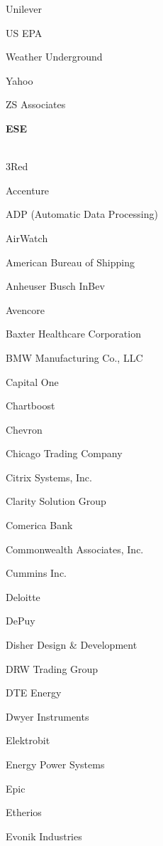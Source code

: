 \documentclass[twoside]{article}
\begin{document}
\begin{center}
\begin{multicols}{5}
\begin{FlushLeft}
\begin{compactitem}
\item Unilever
\item US EPA
\item Weather Underground
\item Yahoo
\item ZS Associates
\end{compactitem}
        \end{FlushLeft}
        \vspace{1em}
        {\fontsize{14}{16}\selectfont \bf ESE}\\
        \vspace{-1em}
        ~\hrulefill~
        \vspace{-.9em}
        \begin{FlushLeft}
        \begin{compactitem}
        \item 3Red
\item Accenture
\item ADP (Automatic Data Processing)
\item AirWatch
\item American Bureau of Shipping
\item Anheuser Busch InBev
\item Avencore
\item Baxter Healthcare Corporation
\item BMW Manufacturing Co., LLC
\item Capital One
\item Chartboost
\item Chevron
\item Chicago Trading Company
\item Citrix Systems, Inc.
\item Clarity Solution Group
\item Comerica Bank
\item Commonwealth Associates, Inc.
\item Cummins Inc.
\item Deloitte
\item DePuy
\item Disher Design \& Development
\item DRW Trading Group
\item DTE Energy
\item Dwyer Instruments
\item Elektrobit
\item Energy Power Systems
\item Epic
\item Etherios
\item Evonik Industries

\end{compactitem}
\end{FlushLeft}
\end{multicols}
\end{center}
\end{document}
